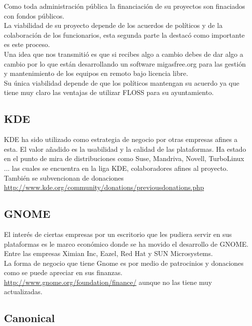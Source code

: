 \documentclass[12pt]{article} %
\begin{document}
Como toda administración pública la financiación de su proyectos son finaciados con fondos públicos.\\La viabilidad de su proyecto depende de los acuerdos de políticos y de la colaboración de los funcionarios, esta segunda parte la destacó como importante es este proceso.\\Una idea que nos transmitió es que si recibes algo a cambio debes de dar algo a cambio por lo que están desarrollando un software migasfree.org para las gestión y mantenimiento de los equipos en remoto bajo licencia libre.\\Su única viabilidad depende de que los políticos mantengan su acuerdo ya que tiene muy claro las ventajas de utilizar FLOSS para su ayuntamiento. 

\subsection{KDE} %

KDE ha sido utilizado como estrategia de negocio por otras empresas afines a esta. El valor añadido es la usabilidad y la calidad de las plataformas. Ha estado en el punto de mira de distribuciones como Suse, Mandriva, Novell, TurboLinux ... las cuales se encuentra en la liga KDE, colaboradores afines al proyecto. \\También se subvencionan de donaciones \url{http://www.kde.org/community/donations/previousdonations.php}

\subsection{GNOME} %

El interés de ciertas empresas por un escritorio que les pudiera servir en sus plataformas es le marco económico donde se ha movido el desarrollo de GNOME. Entre las empresas Ximian Inc, Eazel, Red Hat y SUN Microsystems.\\ La forma de negocio que tiene Gnome es por medio de patrocinios y donaciones como se puede apreciar en sus finanzas. \url{http://www.gnome.org/foundation/finance/} aunque no las tiene muy actualizadas.

\subsection{Canonical} %
\end{document}
